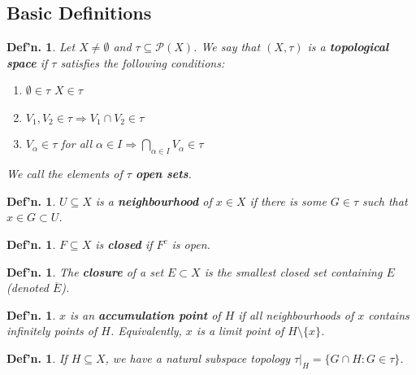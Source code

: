 \documentclass[12pt, a4paper]{book}
\newtheorem{definition}[theorem]{Def'n.}
\theoremstyle{nonumberplain}
\begin{document}
\subsection{Basic Definitions}
\begin{definition}
    Let $X\neq\emptyset$ and $\tau\subseteq\mathcal{P}(X)$.
    We say that $(X,\tau)$ is a \textbf{topological space} if $\tau$ satisfies the following conditions:
    \begin{enumerate}
        \item $\emptyset\in\tau$ $X\in\tau$
        \item $V_1,V_2\in\tau\Rightarrow V_1\cap V_2\in\tau$
        \item $V_\alpha\in\tau$ for all $\alpha\in I\Rightarrow\bigcap\limits_{\alpha\in I}V_\alpha\in\tau$
    \end{enumerate}
    We call the elements of $\tau$ \textbf{open sets}.
\end{definition}
\begin{definition}
    $U\subseteq X$ is a \textbf{neighbourhood} of $x\in X$ if there is some $G\in\tau$ such that $x\in G\subset U$.
\end{definition}
\begin{definition}
    $F\subseteq X$ is \textbf{closed} if $F^c$ is open.
\end{definition}
\begin{definition}
    The \textbf{closure} of a set $E\subset X$ is the smallest closed set containing $E$ (denoted $\overline{E}$).
\end{definition}
\begin{definition}
    $x$ is an \textbf{accumulation point} of $H$ if all neighbourhoods of $x$ contains infinitely points of $H$.
    Equivalently, $x$ is a limit point of $H\setminus\{x\}$.
\end{definition}
\begin{definition}
    If $H\subseteq X$, we have a natural subspace topology $\tau|_H=\{G\cap H:G\in\tau\}$.
\end{definition}
\end{document}
